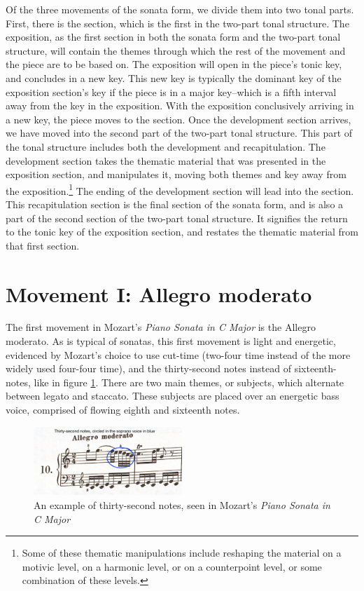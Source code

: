 Of the three movements of the sonata form, we divide them into two tonal parts. First, there is the  section, which is the first in the two-part tonal structure. The exposition, as the first section in both the sonata form and the two-part tonal structure, will contain the themes through which the rest of the movement and the piece are to be based on. The exposition will open in the piece's tonic key, and concludes in a new key. This new key is typically the dominant key of the exposition section's key if the piece is in a major key\autocite{Webster_2001}--which is a fifth interval away from the key in the exposition. With the exposition conclusively arriving in a new key, the piece moves to the  section. Once the development section arrives, we have moved into the second part of the two-part tonal structure. This part of the tonal structure includes both the development and recapitulation\autocite{Webster_2001}. The development section takes the thematic material that was presented in the exposition section, and manipulates it, moving both themes and key away from the exposition.\footnote{Some of these thematic manipulations include reshaping the material on a motivic level, on a harmonic level, or on a counterpoint level, or some combination of these levels.} The ending of the development section will lead into the  section. This recapitulation section is the final section of the sonata form, and is also a part of the second section of the two-part tonal structure. It signifies the return to the tonic key of the exposition section\autocite{Webster_2001}, and restates the thematic material from that first section.

\section{Movement I: Allegro moderato}
The first movement in Mozart's \textit{Piano Sonata in C Major} is the Allegro moderato. As is typical of sonatas, this first movement is light and energetic, evidenced by Mozart's choice to use cut-time (two-four time instead of the more widely used four-four time), and the thirty-second notes instead of sixteenth-notes, like in figure \ref{fig:mozart-thirty-second-notes}\autocite{Henle_1977}. There are two main themes, or subjects, which alternate between legato and staccato. These subjects are placed over an energetic bass voice, comprised of flowing eighth and sixteenth notes.

\begin{figure}
    \centering
    \includegraphics[width=0.5\textwidth]{figures/mozart-thirty-second-notes.png}
    \caption{An example of thirty-second notes, seen in Mozart's \textit{Piano Sonata in C Major}}
    \label{fig:mozart-thirty-second-notes}
\end{figure}

